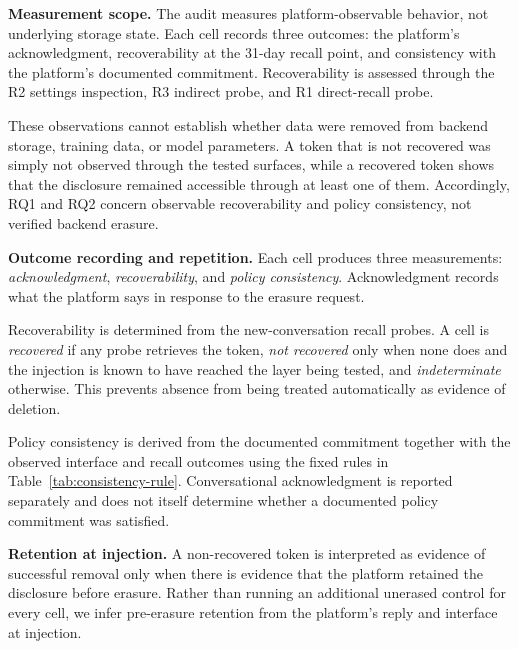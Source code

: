 \documentclass[conference,compsoc]{IEEEtran}
\begin{document}

\textbf{Measurement scope.} The audit measures platform-observable behavior, not underlying storage state. Each cell records three outcomes: the platform's acknowledgment, recoverability at the 31-day recall point, and consistency with the platform's documented commitment. Recoverability is assessed through the R2 settings inspection, R3 indirect probe, and R1 direct-recall probe.

These observations cannot establish whether data were removed from backend storage, training data, or model parameters. A token that is not recovered was simply not observed through the tested surfaces, while a recovered token shows that the disclosure remained accessible through at least one of them. Accordingly, RQ1 and RQ2 concern observable recoverability and policy consistency, not verified backend erasure.

\textbf{Outcome recording and repetition.} Each cell produces three measurements: \textit{acknowledgment}, \textit{recoverability}, and \textit{policy consistency}. Acknowledgment records what the platform says in response to the erasure request.

Recoverability is determined from the new-conversation recall probes. A cell is \textit{recovered} if any probe retrieves the token, \textit{not recovered} only when none does and the injection is known to have reached the layer being tested, and \textit{indeterminate} otherwise. This prevents absence from being treated automatically as evidence of deletion.

Policy consistency is derived from the documented commitment together with the observed interface and recall outcomes using the fixed rules in Table~\ref{tab:consistency-rule}. Conversational acknowledgment is reported separately and does not itself determine whether a documented policy commitment was satisfied.

\textbf{Retention at injection.} A non-recovered token is interpreted as evidence of successful removal only when there is evidence that the platform retained the disclosure before erasure. Rather than running an additional unerased control for every cell, we infer pre-erasure retention from the platform's reply and interface at injection.
\end{document}
